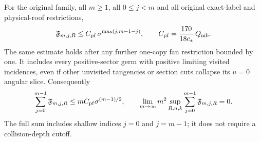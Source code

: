\begin{theorem}
\label{thm:pf-fan}
For the original family, all $m\ge1$, all $0\le j<m$ and all
original exact-label and physical-roof restrictions,
\begin{equation}\label{eq:pf-fan}
 \mathfrak F_{m,j,R}
   \le C_{\rm pf}\,\sigma^{\max(j,m-1-j)},
 \qquad C_{\rm pf}=\frac{170}{18c_*}\,Q_{\rm mb}.
\end{equation}
The same estimate holds after any further one-copy fan restriction
bounded by one.  It includes every positive-sector germ with
positive limiting visited incidences, even if other unvisited
tangencies or section cuts collapse its $u=0$ angular slice.
Consequently
\begin{equation}\label{eq:pf-all-j}
 \sum_{j=0}^{m-1}\mathfrak F_{m,j,R}
   \le m C_{\rm pf}\sigma^{(m-1)/2},\qquad
 \lim_{m\to\infty}m^2\sup_{R,n,k}
                   \sum_{j=0}^{m-1}\mathfrak F_{m,j,R}=0.
\end{equation}
The full sum includes shallow indices $j=0$ and $j=m-1$; it
does not require a collision-depth cutoff.
\end{theorem}
